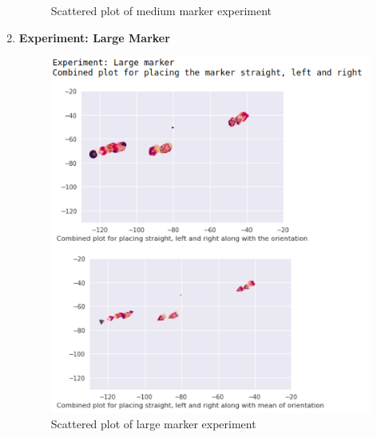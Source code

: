 \documentclass[11pt,a4paper]{article}
\begin{document}
\begin{enumerate}
\begin{figure}[H]
					\caption{Scattered plot of medium marker experiment}
				\end{figure}
				\newpage
				\item \textbf{Experiment: Large Marker}
				\begin{figure}[H]
					\centering
					\includegraphics[scale=0.7]{large}	
					\caption{Scattered plot of large marker experiment}
				\end{figure}
				\end{enumerate}
				\newpage
\end{document}
